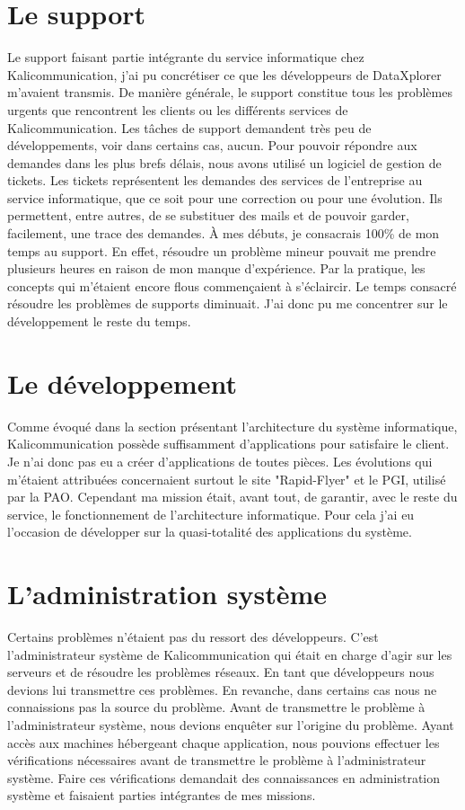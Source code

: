 
\section{Le support}
Le support faisant partie intégrante du service informatique chez Kalicommunication, j'ai pu concrétiser ce que les développeurs de DataXplorer m'avaient transmis. De manière générale, le support constitue tous les problèmes urgents que rencontrent les clients ou les différents services de Kalicommunication. Les tâches de support demandent très peu de développements, voir dans certains cas, aucun.\newline
Pour pouvoir répondre aux demandes dans les plus brefs délais, nous avons utilisé un logiciel de gestion de tickets. Les tickets représentent les demandes des services de l'entreprise au service informatique, que ce soit pour une correction ou pour une évolution. Ils permettent, entre autres, de se substituer des mails et de pouvoir garder, facilement, une trace des demandes.\newline
À mes débuts, je consacrais 100\% de mon temps au support. En effet, résoudre un problème mineur pouvait me prendre plusieurs heures en raison de mon manque d'expérience. Par la pratique, les concepts qui m'étaient encore flous commençaient à s'éclaircir. Le temps consacré résoudre les problèmes de supports diminuait. J'ai donc pu me concentrer sur le développement le reste du temps.

\section{Le développement}
Comme évoqué dans la section présentant l'architecture du système informatique, Kalicommunication possède suffisamment d'applications pour satisfaire le client. Je n'ai donc pas eu a créer d'applications de toutes pièces. Les évolutions qui m'étaient attribuées concernaient surtout le site "Rapid-Flyer" et le PGI, utilisé par la PAO. Cependant ma mission était, avant tout, de garantir, avec le reste du service, le fonctionnement de l'architecture informatique. Pour cela j'ai eu l'occasion de développer sur la quasi-totalité des applications du système.

\section{L'administration système}
Certains problèmes n'étaient pas du ressort des développeurs. C'est l'administrateur système de Kalicommunication qui était en charge d'agir sur les serveurs et de résoudre les problèmes réseaux. En tant que développeurs nous devions lui transmettre ces problèmes. En revanche, dans certains cas nous ne connaissions pas la source du problème. Avant de transmettre le problème à l'administrateur système, nous devions enquêter sur l'origine du problème. Ayant accès aux machines hébergeant chaque application, nous pouvions effectuer les vérifications nécessaires avant de transmettre le problème à l'administrateur système.\newline
Faire ces vérifications demandait des connaissances en administration système et faisaient parties intégrantes de mes missions.